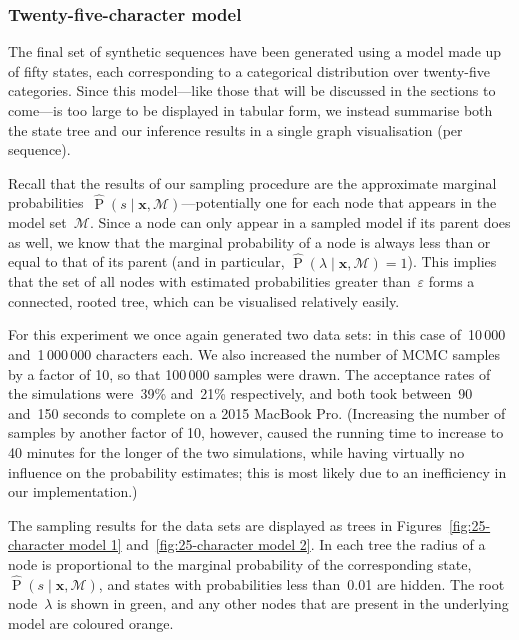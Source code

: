 \documentclass[12pt,a4paper]{article}
\newcommand\mc[1]{\mathcal{#1}}               %
\newcommand\ub[1]{\symbf{#1}}                 %
\DeclareMathOperator\Pb{P}                    %
\begin{document}
\subsubsection{Twenty-five-character model} %

The final set of synthetic sequences have been generated using a model made up
of fifty states, each corresponding to a categorical distribution over
twenty-five categories. Since this model---like those that will be discussed in
the sections to come---is too large to be displayed in tabular form, we instead
summarise both the state tree and our inference results in a single graph
visualisation (per sequence).

Recall that the results of our sampling procedure are the approximate marginal
probabilities~\(\hat{\Pb}(s \mid \ub{x}, \mc{M})\)---potentially one for each
node that appears in the model set~\(\mc{M}\). Since a node can only appear in a
sampled model if its parent does as well, we know that the marginal probability
of a node is always less than or equal to that of its parent (and in particular,
\(\hat{\Pb}(\lambda \mid \ub{x}, \mc{M}) = 1\)). This implies that the set of
all nodes with estimated probabilities greater than~\(\varepsilon\) forms a
connected, rooted tree, which can be visualised relatively easily.

For this experiment we once again generated two data sets: in this case
of~10\,000 and~1\,000\,000 characters each. We also increased the number of MCMC
samples by a factor of 10, so that 100\,000 samples were drawn. The acceptance
rates of the simulations were~39\% and~21\% respectively, and both took
between~90 and~150 seconds to complete on a 2015 MacBook Pro. (Increasing the
number of samples by another factor of 10, however, caused the running time to
increase to 40 minutes for the longer of the two simulations, while having
virtually no influence on the probability estimates; this is most likely due to
an inefficiency in our implementation.)

The sampling results for the data sets are displayed as trees in
Figures~\ref{fig:25-character model 1} and~\ref{fig:25-character model 2}. In
each tree the radius of a node is proportional to the marginal probability of
the corresponding state,~\(\hat{\Pb}(s \mid \ub{x}, \mc{M})\), and states with
probabilities less than~0.01 are hidden. The root node~\(\lambda\) is shown in
green, and any other nodes that are present in the underlying model are coloured
orange.
\end{document}
